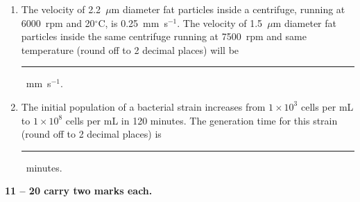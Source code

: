 \documentclass[journal,12pt,onecolumn]{IEEEtran}
\begin{document}
\begin{enumerate}[label=\arabic*.]
\item The velocity of 2.2~$\mu$m diameter fat particles inside a centrifuge, running at 6000~rpm and 20$^\circ$C, is 0.25~mm~s$^{-1}$. The velocity of 1.5~$\mu$m diameter fat particles inside the same centrifuge running at 7500~rpm and same temperature (round off to 2 decimal places) will be \rule{2.5cm}{0.1pt}~mm~s$^{-1}$.

\item The initial population of a bacterial strain increases from $1 \times 10^3$ cells per mL to $1 \times 10^8$ cells per mL in 120 minutes. The generation time for this strain (round off to 2 decimal places) is \rule{2.5cm}{0.1pt}~minutes.

\end{enumerate}

\vspace{0.5cm}

\noindent \textbf{ 11 -- 20 carry two marks each.}
\end{document}
